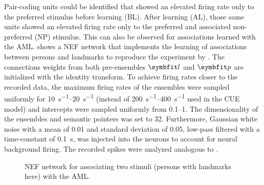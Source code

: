 Pair-coding units could be identified that showed an elevated firing rate only to the preferred stimulus before learning (BL).
After learning (AL), those same units showed an elevated firing rate only to the preferred and associated non-preferred (NP) stimulus.
This can also be observed for associations learned with the AML\@.
 shows a NEF network that implements the learning of associations between persons and landmarks to reproduce the experiment by \textcite{ison2015}.
The connections weights from both pre-ensembles $\vc l$ and $\vc p$ are initialized with the identity transform.
To achieve firing rates closer to the recorded data, the maximum firing rates of the ensembles were sampled uniformly for \SIrange{10}{20}{\second^{-1}} (instead of \SIrange{200}{400}{\second^{-1}} used in the CUE model) and intercepts were sampled uniformly from \numrange{0.1}{1}.
The dimensionality of the ensembles and semantic pointers was set to \num{32}.
Furthermore, Gaussian white noise with a mean of \num{0.01} and standard deviation of \num{0.05}, low-pass filtered with a time-constant of \SI{0.1}{\second}, was injected into the neurons to account for neural background firing.
The recorded spikes were analyzed analogous to \textcite{ison2015}.
\begin{figure}
    \centering
    \caption[NEF network for associating two stimuli with the AML.]{NEF network for associating two stimuli (persons with landmarks here) with the AML.}\label{fig:aml-net}
\end{figure}

